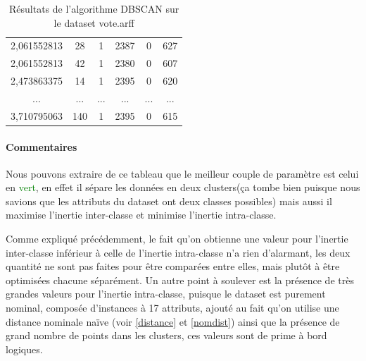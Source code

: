 \begin{table}[H]
\begin{tabular}{|c|c|c|c|c|c|}
				2,061552813         & 28              & 1                   & 2387                                                                        & 0                                                                           & 627            \\
				2,061552813         & 42              & 1                   & 2380                                                                        & 0                                                                           & 607            \\
				2,473863375         & 14              & 1                   & 2395                                                                        & 0                                                                           & 620            \\
				...                 & ...             & ...                 & ...                                                                         & ...                                                                         & ...            \\
				3,710795063         & 140             & 1                   & 2395                                                                        & 0                                                                           & 615            \\ \hline
			\end{tabular}
			\caption{Résultats de l'algorithme DBSCAN sur le dataset vote.arff}
		\end{table}
		\paragraph{Commentaires}
		Nous pouvons extraire de ce tableau que le meilleur couple de paramètre est celui en \textcolor{green}{vert}, en effet il sépare les données en deux clusters(ça tombe bien puisque nous savions que les attributs du dataset ont deux classes possibles) mais aussi il maximise l'inertie inter-classe et minimise l'inertie intra-classe.
		\par
		Comme expliqué précédemment, le fait qu'on obtienne une valeur pour l'inertie inter-classe inférieur à celle de l'inertie intra-classe n'a rien d'alarmant, les deux quantité ne sont pas faites pour être comparées entre elles, mais plutôt à être optimisées chacune séparément.
		Un autre point à soulever est la présence de très grandes valeurs pour l'inertie intra-classe, puisque le dataset est purement nominal, composée d'instances à 17 attributs, ajouté au fait qu'on utilise une distance nominale naïve (voir \ref{distance} et \ref{nomdist}) ainsi que la présence de grand nombre de points dans les clusters, ces valeurs sont de prime à bord logiques.
